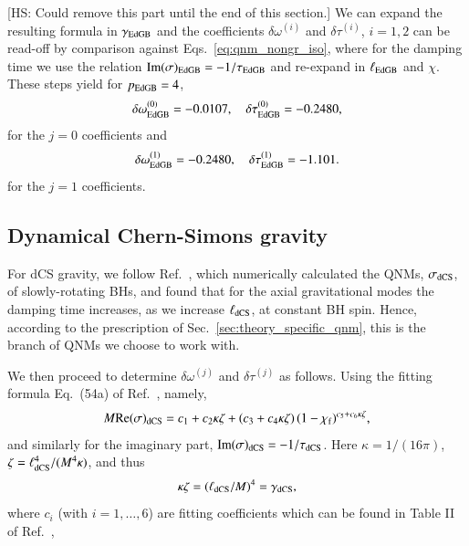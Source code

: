 \documentclass[twocolumn,
               prd,
               aps,
               superscriptaddress,
               tightenlines,
               nofootinbib,
               eqsecnum,
               amsfonts,
               amsmath,
               longbibliography]{revtex4-1}
\newcommand{\hs}[1]{{\textcolor{TealBlue}{{#1}}}}
\newcommand{\hscomm}[1]{{\textcolor{TealBlue}{{[HS: #1]}}}}
\begin{document}
\hscomm{Could remove this part until the end of this section.}
\hs{We can expand the resulting formula} in $\gamma_{\rm EdGB}$ and the coefficients $\delta \omega^{(i)}$ and $\delta \tau^{(i)}$, $i=1,2$ can be
read-off by comparison against Eqs.~\eqref{eq:qnm_nongr_iso}, where for the damping time we use the relation ${\rm Im}(\sigma)_{\rm EdGB} = - 1 / \tau_{\rm EdGB}$
and re-expand in $\ell_{\rm EdGB}$ and $\chi$.
%
These steps yield for $p_{\rm EdGB} = 4$,
%
\begin{align}
     \delta \omega_{\rm EdGB}^{(0)} = -0.0107, \quad \delta \tau_{\rm EdGB}^{(0)} = -0.2480,
\end{align}
%
for the $j=0$ coefficients and
%
\begin{equation}
    \delta \omega_{\rm EdGB}^{(1)} = -0.2480, \quad \delta \tau_{\rm EdGB}^{(1)} = -1.101.
\end{equation}
%
for the $j=1$ coefficients.

%


\subsection{Dynamical Chern-Simons gravity}
\label{app:map_dcs}

For dCS gravity, we follow Ref.~\cite{Wagle:2021tam}, which numerically calculated the QNMs, $\sigma_{\rm dCS}$,
of slowly-rotating BHs, and found that for the axial gravitational modes the damping time increases, as we
increase $\ell_{\rm dCS}$, \hs{at constant BH spin.}
%
Hence, according to the prescription of Sec.~\ref{sec:theory_specific_qnm},
this is the branch of QNMs we choose to work with.

We then proceed to determine $\delta\omega^{(j)}$ and $\delta\tau^{(j)}$ as follows.
%
Using the fitting formula Eq.~(54a) of Ref.~\cite{Wagle:2021tam}, namely,
%
\begin{equation}
    M {\rm Re}(\sigma)_{\rm dCS} = c_{1} + c_{2} \kappa \zeta + (c_{3} + c_{4} \kappa \zeta) \, (1 - \chi_{\rm f})^{c_{5} + c_{6} \kappa \zeta},
    \label{eq:omega_dsc_eg}
\end{equation}
%
and similarly for the imaginary part, ${\rm Im}(\sigma)_{\rm dCS} =  - 1 / \tau_{\rm dCS}$.
%
Here $\kappa = 1/(16 \pi)$, $\zeta = \ell_{\rm dCS}^{4} / (M^4 \kappa)$, and thus
%
\begin{equation}
    \kappa \zeta = (\ell_{\rm dCS} / M)^4 = \gamma_{\rm dCS},
\end{equation}
%
where $c_{i}$ (with $i=1, \dots, 6$) are fitting coefficients which can be found in
Table II of Ref.~\cite{Wagle:2021tam},
\end{document}
